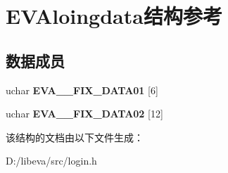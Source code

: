 \hypertarget{struct_e_v_aloingdata}{\section{\-E\-V\-Aloingdata结构参考}
\label{struct_e_v_aloingdata}
}
\subsection*{数据成员}
\begin{DoxyCompactItemize}
\item 
\hypertarget{struct_e_v_aloingdata_abd7dd581bf361f4a59a9fee13c2215b7}{uchar {\bfseries \-E\-V\-A\-\_\-\_\-\-F\-I\-X\-\_\-\-D\-A\-T\-A01} \mbox{[}6\mbox{]}}\label{struct_e_v_aloingdata_abd7dd581bf361f4a59a9fee13c2215b7}

\item 
\hypertarget{struct_e_v_aloingdata_aad0322a3b943b98ac241f512a771c483}{uchar {\bfseries \-E\-V\-A\-\_\-\_\-\-F\-I\-X\-\_\-\-D\-A\-T\-A02} \mbox{[}12\mbox{]}}\label{struct_e_v_aloingdata_aad0322a3b943b98ac241f512a771c483}

\end{DoxyCompactItemize}


该结构的文档由以下文件生成：\begin{DoxyCompactItemize}
\item 
\-D\-:/libeva/src/login.\-h\end{DoxyCompactItemize}

